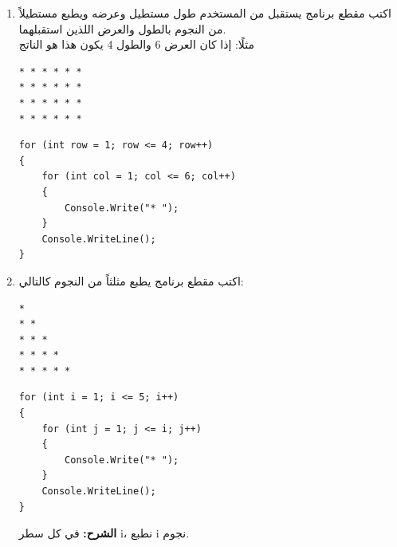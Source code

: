 \documentclass[14pt]{extarticle}
\begin{document}
\clearpage
\begin{enumerate}[itemsep=2em]
    \item
    اكتب مقطع برنامج يستقبل من المستخدم طول مستطيل وعرضه ويطبع مستطيلاً من النجوم بالطول والعرض اللذين استقبلهما. \\
    مثلًا: إذا كان العرض 6 والطول 4 يكون هذا هو الناتج \\
    \begin{english}
    \begin{boxCode}
\begin{verbatim}
* * * * * *
* * * * * *
* * * * * *
* * * * * *
    \end{verbatim}
\end{boxCode}
    \end{english}
    \ifwithsols
    \begin{boxSolution}
    \begin{english}
    \begin{verbatim}
for (int row = 1; row <= 4; row++)
{
    for (int col = 1; col <= 6; col++)
    {
        Console.Write("* ");
    }
    Console.WriteLine();
}
    \end{verbatim}
    \end{english}
    \end{boxSolution}
    \clearpage
    \fi

    \item
    اكتب مقطع برنامج يطبع مثلثاً من النجوم كالتالي:
    \begin{english}
    \begin{boxCode}
\begin{verbatim}
*
* *
* * *
* * * *
* * * * *
    \end{verbatim}
\end{boxCode}
    \end{english}
    \ifwithsols
    \begin{boxSolution}
    \begin{english}
    \begin{verbatim}
for (int i = 1; i <= 5; i++)
{
    for (int j = 1; j <= i; j++)
    {
        Console.Write("* ");
    }
    Console.WriteLine();
}
    \end{verbatim}
    \end{english}
    \textbf{الشرح:} في كل سطر \textenglish{i}، نطبع \textenglish{i} نجوم.
    \end{boxSolution}
    \clearpage
    \fi


\end{enumerate}
\end{document}
